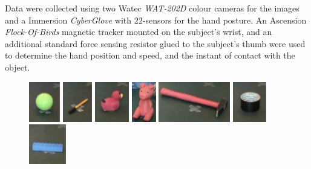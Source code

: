 Data were collected using two Watec \emph{WAT-202D} colour cameras for the images and a  Immersion \emph{CyberGlove} with $22$-sensors for the hand posture. An Ascension \emph{Flock-Of-Birds} magnetic tracker mounted on the subject's wrist, and an additional standard force sensing resistor glued to the subject's thumb were used to determine the hand position and speed, and the instant of contact with the object.\\
\begin{figure}[h!]
	\centering
	\includegraphics[height=1.75cm]{images_pdf/images/palla}
	\includegraphics[height=1.75cm]{images_pdf/images/penna}
	\includegraphics[height=1.75cm]{images_pdf/images/papera}
	\includegraphics[height=1.75cm]{images_pdf/images/porcellino}
	\includegraphics[height=1.75cm]{images_pdf/images/martello}
	\includegraphics[height=1.75cm]{images_pdf/images/scotch}
	\includegraphics[height=1.75cm]{images_pdf/images/lego}\\
	\vskip 0.1cm

\end{figure}

